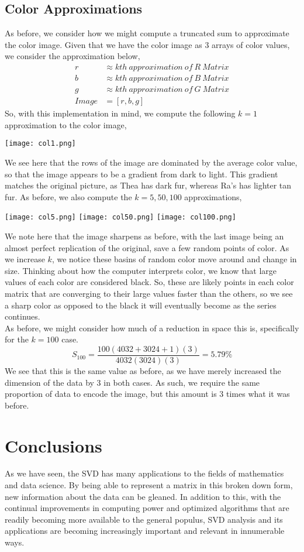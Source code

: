 \documentclass[letterpaper,12pt]{article}
\begin{document}
\subsection{Color Approximations}
As before, we consider how we might compute a truncated sum to approximate the color image. Given that we have the color image as 3 arrays of color values, we consider the approximation below,
\begin{align*}
r &\approx kth\ approximation\ of\ R\ Matrix\\
b &\approx kth\ approximation\ of\ B\ Matrix\\
g &\approx kth\ approximation\ of\ G\ Matrix\\
Image &= [r,b,g]
\end{align*}
So, with this implementation in mind, we compute the following $k=1$ approximation to the color image,
\begin{center}
\texttt{[image: col1.png]}
\end{center}
We see here that the rows of the image are dominated by the average color value, so that the image appears to be a gradient from dark to light. This gradient matches the original picture, as Thea has dark fur, whereas Ra's has lighter tan fur. As before, we also compute the $k=5,50,100$ approximations,
\begin{center}
\texttt{[image: col5.png]}
\texttt{[image: col50.png]}
\texttt{[image: col100.png]}
\end{center}
We note here that the image sharpens as before, with the last image being an almost perfect replication of the original, save a few random points of color. As we increase $k$, we notice these basins of random color move around and change in size. Thinking about how the computer interprets color, we know that large values of each color are considered black. So, these are likely points in each color matrix that are converging to their large values faster than the others, so we see a sharp color as opposed to the black it will eventually become as the series continues.\\
As before, we might consider how much of a reduction in space this is, specifically for the $k=100$ case.
\[S_{100}=\frac{100(4032+3024+1)(3)}{4032(3024)(3)}=5.79\%\]
We see that this is the same value as before, as we have merely increased the dimension of the data by 3 in both cases. As such, we require the same proportion of data to encode the image, but this amount is 3 times what it was before.
\section{Conclusions}
As we have seen, the SVD has many applications to the fields of mathematics and data science. By being able to represent a matrix in this broken down form, new information about the data can be gleaned. In addition to this, with the continual improvements in computing power and optimized algorithms that are readily becoming more available to the general populus, SVD analysis and its applications are becoming increasingly important and relevant in innumerable ways.
\end{document}

